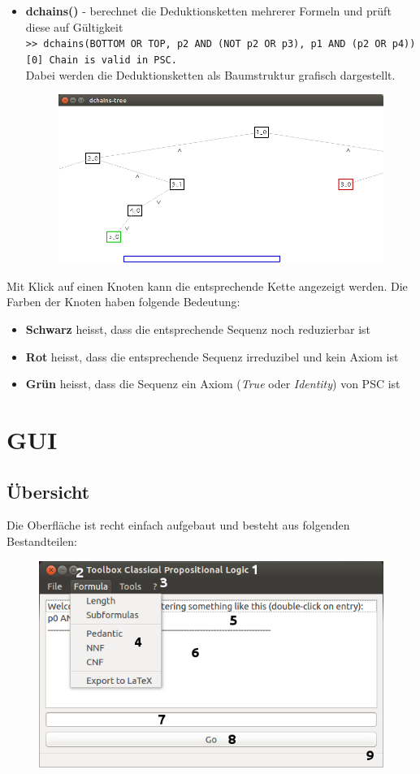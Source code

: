 \documentclass[11pt,a4paper,ngerman]{scrreprt}
\begin{document}
\begin{itemize}
\item \textbf{dchains()} - berechnet die Deduktionsketten mehrerer Formeln und prüft diese auf Gültigkeit \\
\texttt{>> dchains(BOTTOM OR TOP, p2 AND (NOT p2 OR p3), p1 AND (p2 OR p4))} \\
\texttt{[0] Chain is valid in PSC.}\\
Dabei werden die Deduktionsketten als Baumstruktur grafisch dargestellt.
\begin{figure}[ht]
\centering
\includegraphics[width=.9\linewidth]{pics/tree2a}
\end{figure}
\end{itemize}
\newpage \noindent Mit Klick auf einen Knoten kann die entsprechende Kette angezeigt werden. Die Farben der Knoten haben folgende Bedeutung:
\begin{itemize}
\item \textbf{Schwarz} heisst, dass die entsprechende Sequenz noch reduzierbar ist
\item \textbf{Rot} heisst, dass die entsprechende Sequenz irreduzibel und kein Axiom ist
\item \textbf{Grün} heisst, dass die Sequenz ein Axiom (\textit{True} oder \textit{Identity}) von PSC ist
\end{itemize}

\section{GUI}
\subsection{Übersicht}
Die Oberfläche ist recht einfach aufgebaut und besteht aus folgenden Bestandteilen:

\begin{figure}[ht]
\centering
\includegraphics[width=.7\linewidth]{pics/gui2.png}
\end{figure}
\end{document}
